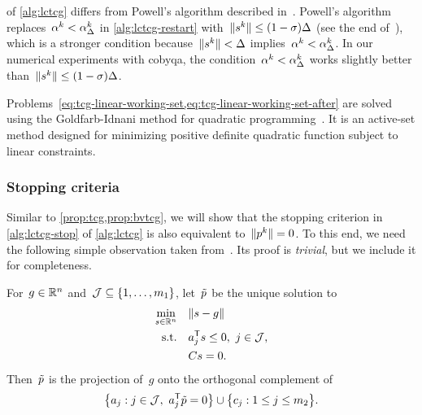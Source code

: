  of \cref{alg:lctcg} differs from Powell's algorithm described in~\cite[\S~3,\S~5]{Powell_2015}.
Powell's algorithm replaces~$\alpha^k < \alpha_{\rad}^k$ in \cref{alg:lctcg-restart} with~$\norm{\sstep[k]} \le (1-\sigma)\rad$ (see the end of~\cite[\S~3]{Powell_2015}),
which is a stronger condition because~$\norm{\sstep[k]} < \rad$ implies~$\alpha^k < \alpha_{\rad}^k$.
In our numerical experiments with \gls{cobyqa}, the condition~$\alpha^k < \alpha_{\rad}^k$ works slightly better than~$\norm{\sstep[k]} \le (1-\sigma)\rad$.

Problems~\cref{eq:tcg-linear-working-set,eq:tcg-linear-working-set-after} are solved using the Goldfarb-Idnani method for quadratic programming~\cite{Goldfarb_Idnani_1983}.
It is an active-set method designed for minimizing positive definite quadratic function subject to linear constraints.

\subsubsection{Stopping criteria}

Similar to \cref{prop:tcg,prop:bvtcg}, we will show that the stopping criterion
in \cref{alg:lctcg-stop} of \cref{alg:lctcg} is also equivalent to~$\norm{\pstep[k]} = 0$.
To this end, we need the following simple observation taken from~\cite[\S~3]{Powell_2015}.
Its proof is \emph{trivial}, but we include it for completeness.

\begin{lemma}
    \label{lem:lctcg}
    For~$g \in \mathbb{R}^n$ and~$\mathcal{J} \subseteq \{1, \dots, m_1\}$, let~$\tilde{\pstep}$ be the unique solution to
    \begin{subequations}
        \label{eq:lctcg-lemma}
        \begin{align}
            \min_{\sstep \in \R^n}  & \quad \norm{\sstep - g}\\
            \text{s.t.}             & \quad a_j^{\T} \sstep \le 0, ~ j \in \mathcal{J},\\
                                    & \quad C \sstep = 0.
        \end{align}
    \end{subequations}
    Then~$\tilde{\pstep}$ is the projection of~$g$ onto the orthogonal complement of
    \begin{equation*}
        \set[\big]{a_j : j \in \mathcal{J}, ~ a_j^{\T} \tilde{\pstep} = 0} \cup \set[\big]{c_j : 1 \le j \le m_2}.
    \end{equation*}
\end{lemma}

